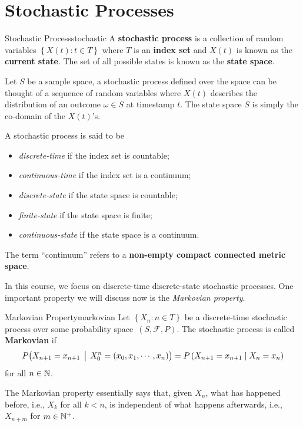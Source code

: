 \documentclass[math, code]{amznotes}
\theoremstyle{remark}
\begin{document}
\section{Stochastic Processes}
\begin{dfnbox}{Stochastic Process}{stochastic}
    A {\color{red} \textbf{stochastic process}} is a collection of random variables $\left\{X\left(t\right) \colon t \in T\right\}$ where $T$ is an {\color{red} \textbf{index set}} and $X\left(t\right)$ is known as the {\color{red} \textbf{current state}}. The set of all possible states is known as the {\color{red} \textbf{state space}}.
\end{dfnbox}
Let $S$ be a sample space, a stochastic process defined over the space can be thought of a sequence of random variables where $X\left(t\right)$ describes the distribution of an outcome $\omega \in S$ at timestamp $t$. The state space $S$ is simply the co-domain of the $X\left(t\right)$'s.

A stochastic process is said to be 
\begin{itemize}
    \item \textit{discrete-time} if the index set is countable;
    \item \textit{continuous-time} if the index set is a continuum;
    \item \textit{discrete-state} if the state space is countable;
    \item \textit{finite-state} if the state space is finite;
    \item \textit{continuous-state} if the state space is a continuum.
\end{itemize}
The term ``continuum'' refers to a \textbf{non-empty compact connected metric space}. 

In this course, we focus on discrete-time discrete-state stochastic processes. One important property we will discuss now is the \textit{Markovian property}.
\begin{dfnbox}{Markovian Property}{markovian}
    Let $\left\{X_n \colon n \in T\right\}$ be a discrete-time stochastic process over some probability space~$\left(S, \mathcal{F}, P\right)$. The stochastic process is called {\color{red} \textbf{Markovian}} if 
    \begin{equation*}
        P\bigl(X_{n + 1} = x_{n + 1} \,\bigm\vert\, X_0^n = \left(x_0, x_1, \cdots, x_n\right)\bigr) = P\left(X_{n + 1} = x_{n + 1} \mid X_n = x_n\right)
    \end{equation*}
    for all $n \in \mathbb{N}$.
\end{dfnbox}
The Markovian property essentially says that, given $X_n$, what has happened before, i.e., $X_k$ for all $k < n$, is independent of what happens afterwards, i.e., $X_{n + m}$ for $m \in \mathbb{N}^+$.
\end{document}
